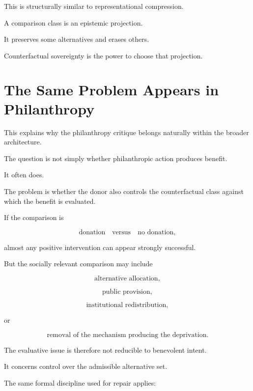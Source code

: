 \documentclass[11pt]{article}
\theoremstyle{remark}
\begin{document}
This is structurally similar to representational compression.

A comparison class is an epistemic projection.

It preserves some alternatives and erases others.

Counterfactual sovereignty is the power to choose that projection.

\section{The Same Problem Appears in Philanthropy}

This explains why the philanthropy critique belongs naturally within the broader architecture.

The question is not simply whether philanthropic action produces benefit.

It often does.

The problem is whether the donor also controls the counterfactual class against which the benefit is evaluated.

If the comparison is

\begin{equation}
\text{donation}
\quad\text{versus}\quad
\text{no donation},
\end{equation}

almost any positive intervention can appear strongly successful.

But the socially relevant comparison may include

\begin{equation}
\text{alternative allocation},
\end{equation}

\begin{equation}
\text{public provision},
\end{equation}

\begin{equation}
\text{institutional redistribution},
\end{equation}

or

\begin{equation}
\text{removal of the mechanism producing the deprivation}.
\end{equation}

The evaluative issue is therefore not reducible to benevolent intent.

It concerns control over the admissible alternative set.

The same formal discipline used for repair applies:
\end{document}
